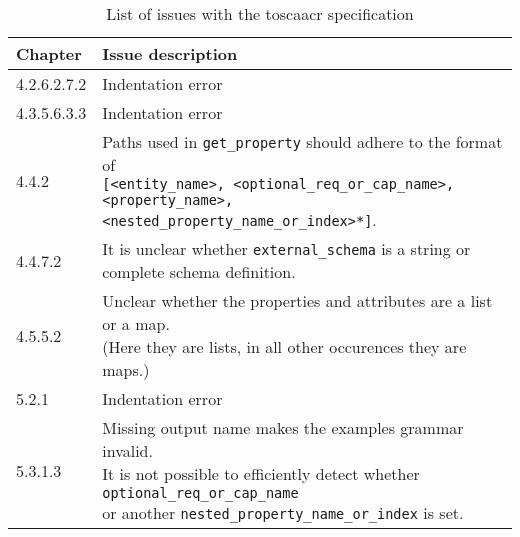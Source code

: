 \begin{table}[h]
  \caption{List of issues with the \gls{toscaacr} specification}
  \begin{tabular}{ | l | l | }
    \hline
    Chapter & Issue description \\
    \hline \hline
    \hline
    4.2.6.2.7.2 & Indentation error \\
    4.3.5.6.3.3 & Indentation error \\
    \hline
    4.4.2 & \makecell{Paths used in \texttt{get_property} should adhere to the format of \\ \texttt{[<entity_name>, <optional_req_or_cap_name>, <property_name>,} \\ \texttt{<nested_property_name_or_index>*]}.} \\
    \hline
    4.4.7.2 & \makecell{It is unclear whether \texttt{external_schema} is a string or \\ complete schema definition.} \\
    \hline
    4.5.5.2 & \makecell{Unclear whether the properties and attributes are a list or a map. \\ (Here they are lists, in all other occurences they are maps.)} \\
    \hline
    5.2.1 & Indentation error \\
    \hline
    5.3.1.3 & \makecell{Missing output name makes the examples grammar invalid. \\ It is not possible to efficiently detect whether \texttt{optional_req_or_cap_name} \\ or another \texttt{nested_property_name_or_index} is set.} \\
    \hline
  \end{tabular}
  \label{tab:tosca_issues}
\end{table}


